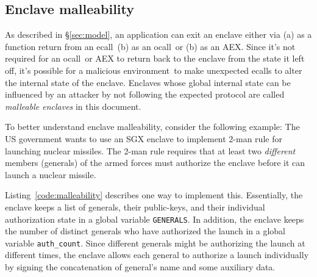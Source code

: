 \documentclass[10pt, letterpaper]{article}
\newcommand{\secref}[1]{\S\ref{#1}}
\newcommand{\ecall}{\textsf{ecall}}
\newcommand{\ocall}{\textsf{ocall}}
\newcommand{\env}{\textsf{environment}}
\begin{document}
  \subsection{Enclave malleability}
  \label{ssec:malleability}
  As described in \secref{sec:model}, an application can exit an
  enclave either via (a) as a function return from an \ecall\ (b) as
  an \ocall\ or (b) as an AEX. Since it's not required for an
  \ocall\ or AEX to return back to the enclave from the state it left
  off, it's possible for a malicious \env\ to make unexpected \ecall s
  to alter the internal state of the enclave. Enclaves whose global
  internal state can be influenced by an attacker by not following the
  expected protocol are called \textit{malleable enclaves} in this
  document.

  To better understand enclave malleability, consider the following
  example: The US government wants to use an SGX enclave to implement
  2-man rule for launching nuclear missiles. The 2-man rule requires
  that at least two \textit{different} members (generals) of the armed
  forces must authorize the enclave before it can launch a nuclear
  missile.

  Listing~\ref{code:malleability} describes one way to implement this.
  Essentially, the enclave keeps a list of generals, their
  public-keys, and their individual authorization state in a global
  variable \texttt{GENERALS}. In addition, the enclave keeps the
  number of distinct generals who have authorized the launch in a
  global variable \texttt{auth\_count}. Since different generals might
  be authorizing the launch at different times, the enclave allows
  each general to authorize a launch individually by signing the
  concatenation of general's name and some auxiliary data.
\end{document}
